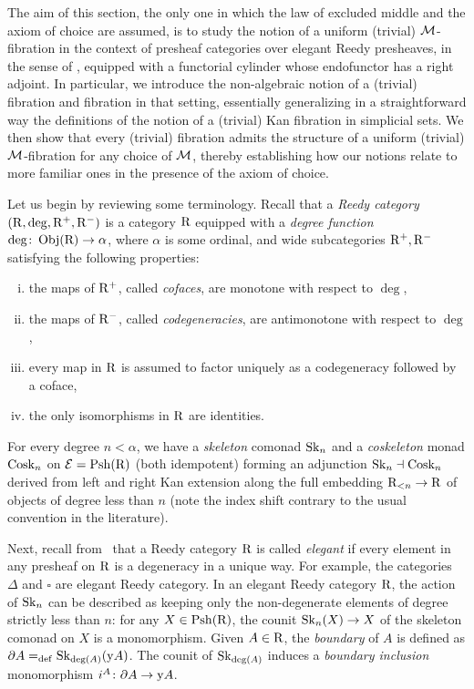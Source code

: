 \documentclass[reqno,10pt,a4paper,oneside,draft]{amsart}
\begin{document}
The aim of this section, the only one in which the law of excluded middle and the axiom of choice are assumed, is to study the notion of a uniform (trivial) $\cal{M}$-fibration in the context of presheaf categories over elegant Reedy presheaves, in the sense of \cite{bergner-rezk-elegant}, equipped with a functorial cylinder whose endofunctor has a right adjoint.
In particular, we introduce the non-algebraic notion of a (trivial) fibration and fibration in that setting, essentially generalizing in a straightforward way the definitions of the notion of a (trivial) Kan fibration in simplicial sets.
We then show that every (trivial) fibration admits the structure of a uniform (trivial) $\cal{M}$-fibration for any choice of $\cal{M}$, thereby establishing how our notions relate to more familiar ones in the presence of the axiom of choice.

Let us begin by reviewing some terminology.
Recall that a \emph{Reedy category} $(\R, \deg, \Rp, \Rm)$ is a category $\R$ equipped with a \emph{degree function} $\deg \co \obj(\R) \to \alpha$, where $\alpha$ is some ordinal, and wide subcategories $\Rp, \Rm$ satisfying the following properties:
\begin{enumerate}[(i)]
\item the maps of $\Rp$, called \emph{cofaces}, are monotone with respect to $\deg$,
\item the maps of $\Rm$, called \emph{codegeneracies}, are antimonotone with respect to $\deg$,
\item every map in $\R$ is assumed to factor uniquely as a codegeneracy followed by a coface,
\item the only isomorphisms in $\R$ are identities.
\end{enumerate}
For every degree $n < \alpha$, we have a \emph{skeleton} comonad $\Sk_n$ and a \emph{coskeleton} monad $\Cosk_n$ on $\catE = \Psh(\R)$ (both idempotent) forming an adjunction $\Sk_n \dashv \Cosk_n$ derived from left and right Kan extension along the full embedding $\R_{<n} \to \R$ of objects of degree less than $n$ (note the index shift contrary to the usual convention in the literature).

Next, recall from~\cite{bergner-rezk-elegant} that a Reedy category $\R$ is called \emph{elegant} if every element in any presheaf on $\R$ is a degeneracy in a unique way.
For example, the categories $\Delta$ and $\square$ are elegant Reedy category.
In an elegant Reedy category $\R$, the action of $\Sk_n$ can be described as keeping only the non-degenerate elements of degree strictly less than $n$: for any $X \in \Psh(\R)$, the counit $\Sk_n(X) \to X$ of the skeleton comonad on $X$ is a monomorphism.
Given $A \in \R$, the \emph{boundary} of $A$ is defined as $\partial A \defeq \Sk_{\deg(A)}(\yon A)$.
The counit of $\Sk_{\deg(A)}$ induces a \emph{boundary inclusion} monomorphism $i^A \co \partial A \to \yon A$.
\end{document}
